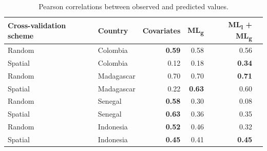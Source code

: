 \documentclass[11pt]{article}
\begin{document}
\begin{table}[h!]
\caption{Pearson correlations between observed and predicted values. }
\centering
\begin{tabular}{llrrrr}
Cross-validation scheme & Country &  Covariates &   ML\textsubscript{g} & ML\textsubscript{l} + ML\textsubscript{g} \\
\hline 
 Random &  Colombia & \textbf{0.59} &0.58 & 0.56 \\
 Spatial &  Colombia &  0.12 &  0.18 & \textbf{0.34}\\
 Random &  Madagascar &  0.70 &  0.70 & \textbf{0.71} \\
 Spatial &  Madagascar &  0.22 &  \textbf{0.63} & 0.60\\
 Random &  Senegal &  \textbf{0.58} &  0.30 & 0.08 \\
 Spatial &  Senegal &  \textbf{0.63} & 0.36 & 0.35 \\
 Random &  Indonesia &  \textbf{0.52} & 0.46 & 0.32 \\
 Spatial &  Indonesia &  \textbf{0.45} & 0.41 & \textbf{0.45} \\
\end{tabular}
\label{t:results}
\end{table}


\end{document}
